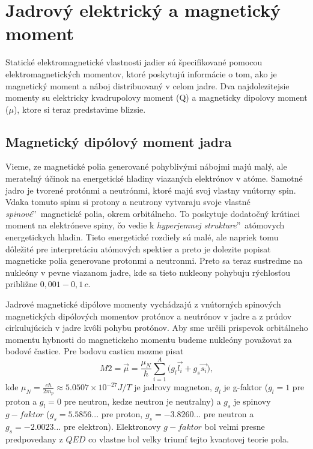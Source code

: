 \documentclass[../../main.tex]{subfiles}
\begin{document}
\section{Jadrový elektrický a magnetický moment}
Statické elektromagnetické vlastnosti jadier sú špecifikované pomocou elektromagnetických momentov, ktoré poskytujú informácie o tom, ako je magnetický moment a náboj distribuovaný v celom jadre. Dva najdolezitejsie momenty su elektricky kvadrupolovy moment (Q) a magneticky dipolovy moment ($\mu$), ktore si teraz predstavime blizsie.
\subsection{Magnetický dipólový moment jadra}
Vieme, ze magnetické polia generované pohyblivými nábojmi majú malý, ale merateľný účinok na energetické hladiny viazaných elektrónov v atóme. Samotné jadro je tvorené protónmi a neutrónmi, ktoré majú svoj vlastny vnútorny spin. Vdaka tomuto spinu si protony a neutrony vytvaraju svoje vlastné \quotedblbase \textit{spinové}\textquotedblright ~magnetické polia, okrem orbitálneho. To poskytuje dodatočný krútiaci moment na elektróneve spiny, čo vedie k \quotedblbase \textit{hyperjemnej strukture}\textquotedblright ~atómovych energetickych hladin. Tieto energetické rozdiely sú malé, ale napriek tomu dôležité pre interpretáciu atómových spektier a preto je dolezite popisat magneticke polia generovane protonmi a neutronmi. Preto sa teraz sustredme na nukleóny v pevne viazanom jadre, kde sa tieto nukleony pohybuju rýchlosťou približne $0,001-0,1\,c$.\par
Jadrové magnetické dipólove momenty vychádzajú z vnútorných spinových magnetických dipólových momentov protónov a neutrónov v jadre a z prúdov cirkulujúcich v jadre kvôli pohybu protónov. Aby sme určili prispevok orbitálneho momentu hybnosti do magnetickeho momentu budeme nukleóny považovat za bodové častice. Pre bodovu casticu mozme pisat 
\begin{equation}
M2=\vec{\mu}=\frac{\mu_N}{\hbar}\sum_{i=1}^A\big( g_l\vec{l_i} + g_s\vec{s_i} \big),
\end{equation}
kde $\mu_N=\frac{e\hbar}{2m_p}\approx5.0507\times 10^{-27}J/T$ je jadrovy magneton, $g_l$ je g-faktor ($g_l=1$ pre proton a $g_l=0$ pre neutron, kedze neutron je neutralny) a $g_s$ je spinovy $g-faktor$ ($g_s=5.5856...$ pre proton, $g_s=-3.8260...$ pre neutron a $g_s=-2.0023...$ pre elektron). Elektronovy $g-faktor$ bol velmi presne predpovedany z $QED$ co vlastne bol velky triumf tejto kvantovej teorie pola.
\end{document}
